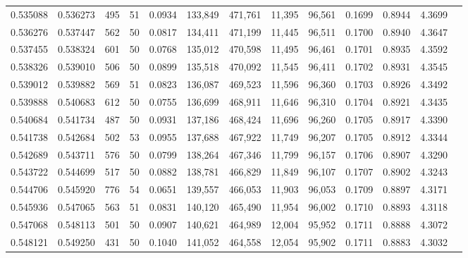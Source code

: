 \begin{tabular}{rrrrrrrrrrrrr}
0.535088 & 0.536273 &   495 &  51 &                                     0.0934 & 133,849 & 471,761 &  11,395 &  96,561 & 0.1699 & 0.8944 & 4.3699 \\
0.536276 & 0.537447 &   562 &  50 &                                     0.0817 & 134,411 & 471,199 &  11,445 &  96,511 & 0.1700 & 0.8940 & 4.3647 \\
0.537455 & 0.538324 &   601 &  50 &                                     0.0768 & 135,012 & 470,598 &  11,495 &  96,461 & 0.1701 & 0.8935 & 4.3592 \\
0.538326 & 0.539010 &   506 &  50 &                                     0.0899 & 135,518 & 470,092 &  11,545 &  96,411 & 0.1702 & 0.8931 & 4.3545 \\
0.539012 & 0.539882 &   569 &  51 &                                     0.0823 & 136,087 & 469,523 &  11,596 &  96,360 & 0.1703 & 0.8926 & 4.3492 \\
0.539888 & 0.540683 &   612 &  50 &                                     0.0755 & 136,699 & 468,911 &  11,646 &  96,310 & 0.1704 & 0.8921 & 4.3435 \\
0.540684 & 0.541734 &   487 &  50 &                                     0.0931 & 137,186 & 468,424 &  11,696 &  96,260 & 0.1705 & 0.8917 & 4.3390 \\
0.541738 & 0.542684 &   502 &  53 &                                     0.0955 & 137,688 & 467,922 &  11,749 &  96,207 & 0.1705 & 0.8912 & 4.3344 \\
0.542689 & 0.543711 &   576 &  50 &                                     0.0799 & 138,264 & 467,346 &  11,799 &  96,157 & 0.1706 & 0.8907 & 4.3290 \\
0.543722 & 0.544699 &   517 &  50 &                                     0.0882 & 138,781 & 466,829 &  11,849 &  96,107 & 0.1707 & 0.8902 & 4.3243 \\
0.544706 & 0.545920 &   776 &  54 &                                     0.0651 & 139,557 & 466,053 &  11,903 &  96,053 & 0.1709 & 0.8897 & 4.3171 \\
0.545936 & 0.547065 &   563 &  51 &                                     0.0831 & 140,120 & 465,490 &  11,954 &  96,002 & 0.1710 & 0.8893 & 4.3118 \\
0.547068 & 0.548113 &   501 &  50 &                                     0.0907 & 140,621 & 464,989 &  12,004 &  95,952 & 0.1711 & 0.8888 & 4.3072 \\
0.548121 & 0.549250 &   431 &  50 &                                     0.1040 & 141,052 & 464,558 &  12,054 &  95,902 & 0.1711 & 0.8883 & 4.3032 \\

\end{tabular}
